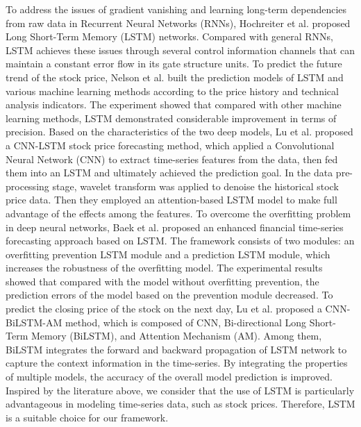 \documentclass[sn-mathphys]{sn-jnl}%
\theoremstyle{thmstyleone}%
\theoremstyle{thmstyletwo}%
\theoremstyle{thmstylethree}%
\begin{document}
To address the issues of gradient vanishing and learning long-term dependencies from raw data in Recurrent Neural Networks (RNNs), Hochreiter et al. \cite{RN180} proposed Long Short-Term Memory (LSTM) networks. Compared with general RNNs, LSTM achieves these issues through several control information channels that can maintain a constant error flow in its gate structure units. To predict the future trend of the stock price, Nelson et al. \cite{RN183} built the prediction models of LSTM and various machine learning methods according to the price history and technical analysis indicators. The experiment showed that compared with other machine learning methods, LSTM demonstrated considerable improvement in terms of precision. Based on the characteristics of the two deep models, Lu et al. \cite{RN181} proposed a CNN-LSTM stock price forecasting method, which applied a Convolutional Neural Network (CNN) to extract time-series features from the data, then fed them into an LSTM and ultimately achieved the prediction goal. In the data pre-processing stage, wavelet transform was applied to denoise the historical stock price data\cite{RN182}. Then they employed an attention-based LSTM model to make full advantage of the effects among the features. To overcome the overfitting problem in deep neural networks, Baek et al. \cite{RN184} proposed an enhanced financial time-series forecasting approach based on LSTM. The framework consists of two modules: an overfitting prevention LSTM module and a prediction LSTM module, which increases the robustness of the overfitting model. The experimental results showed that compared with the model without overfitting prevention, the prediction errors of the model based on the prevention module decreased. To predict the closing price of the stock on the next day, Lu et al.\cite{RN198} proposed a CNN-BiLSTM-AM method, which is composed of CNN, Bi-directional Long Short-Term Memory (BiLSTM), and Attention Mechanism (AM). Among them, BiLSTM integrates the forward and backward propagation of LSTM network to capture the context information in the time-series. By integrating the properties of multiple models, the accuracy of the overall model prediction is improved. Inspired by the literature above, we consider that the use of LSTM is particularly advantageous in modeling time-series data, such as stock prices. Therefore, LSTM is a suitable choice for our framework.
\end{document}
